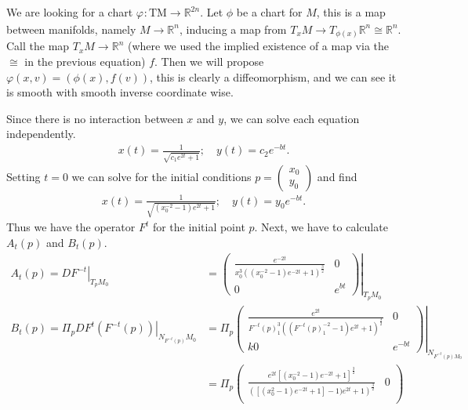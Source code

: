 \begin{solution}[9.3]
We are looking for a chart $\varphi_{}:  \textrm{TM} \to \mathbb{R}^{2n}$. Let $\phi$ be a chart for $M$, this is a map between manifolds, namely $M \to \mathbb{R}^{n}$, inducing a map from $T_xM \to T_{\phi(x)}\mathbb{R}^{n} \cong \mathbb{R}^{n}$. Call the map $T_xM \to \mathbb{R}^{n}$ (where we used the implied existence of a map via the $\cong$ in the previous equation) $f$. Then we will propose $\varphi(x,v) = (\phi(x),f(v)) $, this is clearly a diffeomorphism, and we can see it is smooth with smooth inverse coordinate wise. 
\end{solution}

\begin{solution}[9.4]
Since there is no interaction between $x$ and $y$, we can solve each equation independently.
\begin{align}
	x(t) = \frac{1}{\sqrt{c_1e^{2t} + 1}}; \quad y(t) = c_2 e^{-bt}.
\end{align}
Setting $t=0$ we can solve for the initial conditions $p =
\begin{pmatrix}
	x_0\\ y_0
\end{pmatrix}
$
and find 
\begin{align}
	x(t) = \frac{1}{\sqrt{(x_0^{-2} -1)e^{2t}+1}}; \quad y(t) = y_0 e^{-bt}.
\end{align}
Thus we have the operator $F^t$ for the initial point $p$. Next, we have to calculate $A_t(p)$ and $B_t(p)$.
\begin{align}
	A_t(p) = \left.DF^{-t} \right|_{T_p M_0} &= 
	\left.
	\begin{pmatrix}
		\frac{e^{-2t}}{x_0^{3} \left( (x_0^{-2} -1) e^{-2t} +1 \right)^{\frac{3}{2}}} & 0\\
		0& e^{bt}
	\end{pmatrix}
	\right|_{T_pM_0} \\
	B_t(p) = \Pi_p \left. DF^{t}(F^{-t}(p)) \right|_{N_{F^{-t}(p)}M_0} &= \left.\Pi_p  
	\begin{pmatrix}
		\frac{e^{2t}}{F^{-t}(p)_1^{3} \left( (F^{-t}(p)_1^{-2} -1) e^{2t} +1 \right)^{\frac{3}{2}}} & 0\\
		k0& e^{-bt}
	\end{pmatrix}
	\right|_{N_{F^{-t}(p)M_0}}
	\\
									   &=	\left.\Pi_p 
	\begin{pmatrix}
		\frac{	e^{2t} \left[ (x_0^{-2} -1)e^{-2t}+1 \right]^{\frac{3}{2}}}{\left([(x_0^2 -1)e^{-2t} +1]-1)e^{2t}+1\right)^{\frac{3}{2}}} & 0 \\

\end{pmatrix}
\end{align}
\end{solution}
